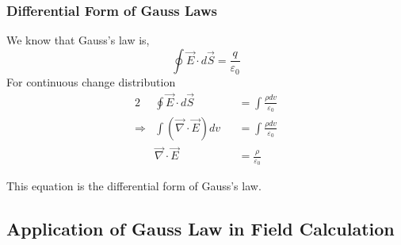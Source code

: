 \subsubsection{Differential Form of Gauss Laws}
We know that Gauss's law is,
$$
\oint \vec{E} \cdot d \vec{S}=\frac{q}{\varepsilon_{0}}
$$
For continuous change distribution
\begin{alignat*}{2}
& \oint \vec{E} \cdot d \vec{S}&&=\int \frac{\rho d v}{\varepsilon_{0}} \\
\Rightarrow & \int(\vec{\nabla} \cdot \vec{E}) d v&&=\int \frac{\rho d v}{\varepsilon_{0}} \\
& \vec{\nabla} \cdot \vec{E}&&=\frac{\rho}{\varepsilon_{0}}
\end{alignat*}

This equation is the differential form of Gauss's law.
\begin{center}
\end{center}
\subsection{Application of Gauss Law in Field Calculation}
